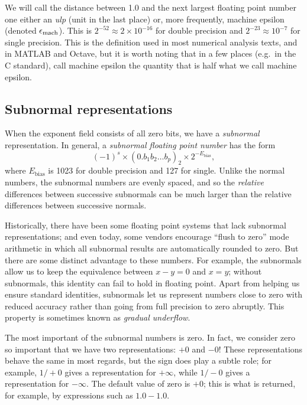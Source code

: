 \documentclass[12pt, leqno]{article} %
\begin{document}
We will call the distance between 1.0 and the next largest floating
point number one either an {\em ulp} (unit in the last place) or,
more frequently, machine epsilon (denoted $\epsilon_{\mathrm{mach}}$).  This is
$2^{-52} \approx 2 \times 10^{-16}$ for double precision and
$2^{-23} \approx 10^{-7}$ for single precision.  This is the definition
used in most numerical analysis texts, and in MATLAB and Octave, but
it is worth noting that in a few places (e.g.~in the C standard),
call machine epsilon the quantity that is half what we
call machine epsilon.

\subsection{Subnormal representations}

When the exponent field consists of all zero bits, we have a
{\em subnormal} representation.
In general, a {\em subnormal floating point number} has the form
\[
  (-1)^s \times (0.b_1 b_2 \ldots b_p)_2 \times 2^{-E_{\mathrm{bias}}},
\]
where $E_{\mathrm{bias}}$ is 1023 for double precision and 127
for single.  Unlike the normal numbers, the subnormal numbers are
evenly spaced, and so the {\em relative} differences between
successive subnormals can be much larger than the relative differences
between successive normals.

Historically, there have been some floating point systems that lack
subnormal representations; and even today, some vendors encourage
``flush to zero'' mode arithmetic in which all subnormal results are
automatically rounded to zero.  But there are some distinct advantage
to these numbers.  For example, the subnormals allow us to keep the
equivalence between $x-y = 0$ and $x = y$; without subnormals, this
identity can fail to hold in floating point.  Apart from helping us
ensure standard identities, subnormals let us represent numbers close
to zero with reduced accuracy rather than going from full precision to
zero abruptly.  This property is sometimes known as {\em gradual underflow}.

The most important of the subnormal numbers is zero.  In fact, we consider
zero so important that we have two representations: $+0$ and $-0$!
These representations behave the same in most regards, but the sign
does play a subtle role; for example, $1/+0$ gives a representation
for $+\infty$, while $1/-0$ gives a representation for $-\infty$.
The default value of zero is $+0$; this is what is returned, for example,
by expressions such as $1.0-1.0$.
\end{document}
